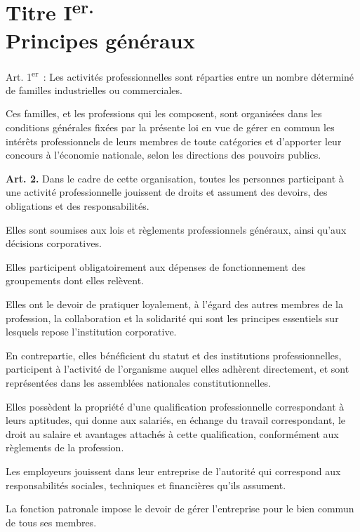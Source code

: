 \documentclass[french,twoside]{book} %
\newcommand{\labelchar}[1]{\textbf{\color{rubric} #1}}
\begin{document}
\section[Titre Ier. Principes généraux]{Titre I\textsuperscript{er.} \\
Principes généraux}\renewcommand{\leftmark}{Titre I\textsuperscript{er.} \\
Principes généraux}

\noindent Art. 1\textsuperscript{er} : Les activités professionnelles sont réparties entre un nombre déterminé de familles industrielles ou commerciales.\par
Ces familles, et les professions qui les composent, sont organisées dans les conditions générales fixées par la présente loi en vue de gérer en commun les intérêts professionnels de leurs membres de toute catégories et d’apporter leur concours à l’économie nationale, selon les directions des pouvoirs publics.\par
\bigbreak
\noindent \labelchar{Art. 2.} Dans le cadre de cette organisation, toutes les personnes participant à une activité professionnelle jouissent de droits et assument des devoirs, des obligations et des responsabilités.\par
Elles sont soumises aux lois et règlements professionnels généraux, ainsi qu’aux décisions corporatives.\par
Elles participent obligatoirement aux dépenses de fonctionnement des groupements dont elles relèvent.\par
Elles ont le devoir de pratiquer loyalement, à l’égard des autres membres de la profession, la collaboration et la solidarité qui sont les principes essentiels sur lesquels repose l’institution corporative.\par
En contrepartie, elles bénéficient du statut et des institutions professionnelles, participent à l’activité de l’organisme auquel elles adhèrent directement, et sont représentées dans les assemblées nationales constitutionnelles.\par
Elles possèdent la propriété d’une qualification professionnelle correspondant à leurs aptitudes, qui donne aux salariés, en échange du travail correspondant, le droit au salaire et avantages attachés à cette qualification, conformément aux règlements de la profession.\par
Les employeurs jouissent dans leur entreprise de l’autorité qui correspond aux responsabilités sociales, techniques et financières qu’ils assument.\par
La fonction patronale impose le devoir de gérer l’entreprise pour le bien commun de tous ses membres.\par
\end{document}
